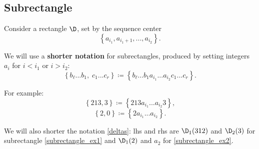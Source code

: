 \subsection{Subrectangle}
Consider a rectangle $\D$, set by the sequence center
\begin{equation*}
	\left\{ a_{i_1}, a_{i_1 + 1}, ..., a_{i_2} \right\}.
\end{equation*}

We will use a \textbf{shorter notation} for subrectangles, produced by setting integers
$a_i$ for $i < i_1$ or $i > i_2$:
\begin{equation*}
	\left\{ b_\ell...b_1,\; c_1...c_r\right\} \coloneqq
	\left\{ b_\ell...b_1 a_{i_1} ... a_{i_2} c_1...c_r\right\}.
\end{equation*}

For example:
\begin{equation}\tag{ex.1}\label{subrectangle_ex1}
	\left\{213, 3\right\} \coloneqq \left\{ 213 a_{i_1} ... a_{i_2} 3\right\},
\end{equation}
\begin{equation}\tag{ex.2}\label{subrectangle_ex2}
	\left\{2, 0\right\} \coloneqq \left\{ 2 a_{i_1} ... a_{i_2}  \right\}.
\end{equation}

We will also shorter the notation \ref{deltas}: lhs and rhs are $\D_1(312)$ and $\D_2(3)$ for subrectangle \ref{subrectangle_ex1} and $\D_1(2)$ and $a_2$ for \ref{subrectangle_ex2}.
